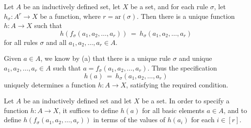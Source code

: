 \begin{theorem}
\label{thmStructuralRecursion}
Let $A$ be an inductively defined set, let $X$ be a set, and for each rule $\sigma$, let $h_{\sigma} : A^r \to X$ be a function, where $r = \mathrm{ar}(\sigma)$. Then there is a unique function $h : A \to X$ such that
\[ h(f_{\sigma}(a_1,a_2,\dots,a_r)) ~=~ h_{\sigma}(a_1,a_2,\dots,a_r) \]
for all rules $\sigma$ and all $a_1,a_2,\dots,a_r \in A$.
\end{theorem}

\begin{cproof}
Given $a \in A$, we know by (a) that there is a unique rule $\sigma$ and unique $a_1,a_2,\dots,a_r \in A$ such that $a = f_{\sigma}(a_1,a_2,\dots,a_r)$. Thus the specification
\[ h(a) ~=~ h_{\sigma}(a_1,a_2,\dots,a_r) \]
uniquely determines a function $h : A \to X$, satisfying the required condition.
\end{cproof}

\begin{strategy}
\label{strStructuralRecursion}
Let $A$ be an inductively defined set and let $X$ be a set. In order to specify a function $h : A \to X$, it suffices to define $h(a)$ for all basic elements $a \in A$, and to define $h(f_{\sigma}(a_1,a_2,\dots,a_r))$ in terms of the values of $h(a_i)$ for each $i \in [r]$.
\end{strategy}

